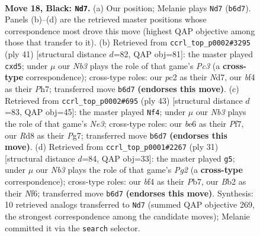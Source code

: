 \documentclass[11pt]{article}
\begin{document}
\clearpage

\begin{figure}[p]\centering
\begin{subfigure}{0.46\textwidth}\centering
\resizebox{\linewidth}{!}{%
\newchessgame
\chessboard[
  setfen={2kr2r1/1pp1p2p/1nn1B1p1/p7/5B1P/N4P2/PbP1KP2/R5R1 b - - 1 18},
  showmover=false,
  pgfstyle=straightmove, color=movearrow, markmove={b6-d7}
]}
\caption{}
\end{subfigure}\hfill
\begin{subfigure}{0.46\textwidth}\centering
\resizebox{\linewidth}{!}{%
\newchessgame
\chessboard[
  setfen={r4rk1/1p1n2pp/p1p5/3B1p2/3P4/RP6/1P1BPP1P/R5K1 b - - 0 21},
  showmover=false,
  pgfstyle=straightmove, color=movearrow, markmove={c6-d5}
]}
\caption{}
\end{subfigure}
\\[4pt]
\begin{subfigure}{0.46\textwidth}\centering
\resizebox{\linewidth}{!}{%
\newchessgame
\chessboard[
  setfen={3rk2r/1p3pp1/p1n1n3/3pP1p1/8/4bNBP/PPP1B1P1/1K1R3R b k - 0 22},
  showmover=false,
  pgfstyle=straightmove, color=movearrow, markmove={e6-f4}
]}
\caption{}
\end{subfigure}\hfill
\begin{subfigure}{0.46\textwidth}\centering
\resizebox{\linewidth}{!}{%
\newchessgame
\chessboard[
  setfen={2kr3r/pp4p1/2np1n1p/1B2pb2/8/2P2N1P/PP3PP1/R1BR2K1 b - - 0 16},
  showmover=false,
  pgfstyle=straightmove, color=movearrow, markmove={g7-g5}
]}
\caption{}
\end{subfigure}
\caption{\textbf{Move 18, Black: \texttt{Nd7}.} (a) Our position; Melanie plays \texttt{Nd7} (\texttt{b6d7}). Panels (b)--(d) are the retrieved master positions whose correspondence most drove this move (highest QAP objective among those that transfer to it). (b) Retrieved from \texttt{ccrl\_top\_p0002\#3295} (ply 41) [structural distance $d$=82, QAP obj=81]: the master played \texttt{cxd5}; under $\mu$ our \emph{Nb3} plays the role of that game's \emph{Pc3} (a \textbf{cross-type} correspondence); cross-type roles: our \emph{p}c2 as their \emph{N}d7, our \emph{b}f4 as their \emph{P}h7; transferred move \texttt{b6d7} \textbf{(endorses this move)}. (c) Retrieved from \texttt{ccrl\_top\_p0002\#695} (ply 43) [structural distance $d$=83, QAP obj=45]: the master played \texttt{Nf4}; under $\mu$ our \emph{Nb3} plays the role of that game's \emph{Ne3}; cross-type roles: our \emph{b}e6 as their \emph{P}f7, our \emph{R}d8 as their \emph{P}g7; transferred move \texttt{b6d7} \textbf{(endorses this move)}. (d) Retrieved from \texttt{ccrl\_top\_p0001\#2267} (ply 31) [structural distance $d$=84, QAP obj=33]: the master played \texttt{g5}; under $\mu$ our \emph{Nb3} plays the role of that game's \emph{Pg2} (a \textbf{cross-type} correspondence); cross-type roles: our \emph{b}f4 as their \emph{P}b7, our \emph{B}b2 as their \emph{N}f6; transferred move \texttt{b6d7} \textbf{(endorses this move)}. Synthesis: 10 retrieved analogs transferred to \texttt{Nd7} (summed QAP objective 269, the strongest correspondence among the candidate moves); Melanie committed it via the \texttt{search} selector.}
\label{fig:thought-m35}
\end{figure}
\end{document}
